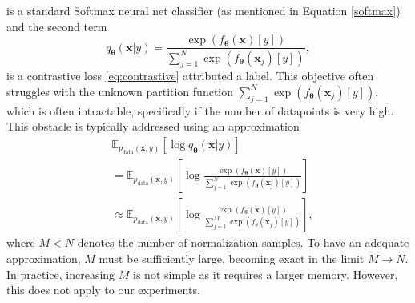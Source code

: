 is a standard Softmax neural net classifier (as mentioned in Equation \eqref{softmax}) and the second term 
\begin{equation}
	q_{\boldsymbol{\theta}}\left(\boldsymbol{x}|y\right) = \frac{\exp\left({f_{\boldsymbol{\theta}}\left(\boldsymbol{x}\right)[y]}\right)}{\sum_{j=1}^N\exp\left({f_{\boldsymbol{\theta}}\left(\boldsymbol{x}_j\right)[y]}\right)},
\end{equation}
is a contrastive loss \eqref{eq:contrastive} attributed a label. This objective often struggles with the unknown partition function $\sum_{j=1}^N\exp\left({f_{\boldsymbol{\theta}}\left({\boldsymbol{x}_j}\right)[y]}\right)$, which is often intractable, specifically if the number of datapoints is very high. This obstacle is typically addressed using an approximation 
\begin{align}\label{approxcontrasstive}
	&\mathbb{E}_{p_{\mathrm{data}}(\boldsymbol{x},y)}\left[ \log q_{\boldsymbol{\theta}}\left(\boldsymbol{x}|y\right) \right] \\
	&=\mathbb{E}_{p_{\mathrm{data}}(\boldsymbol{x},y)}\left[\log \frac{\exp\left({f_{\boldsymbol{\theta}}\left(\boldsymbol{x}\right)[y]}\right)}{\sum_{j=1}^N\exp\left({f_{\boldsymbol{\theta}}\left(\boldsymbol{x}_j\right)[y]}\right)} \right]  \\
	&\approx\mathbb{E}_{p_{\mathrm{data}}(\boldsymbol{x},y)}\left[\log \frac{\exp\left({f_{\boldsymbol{\theta}}\left(\boldsymbol{x}\right)[y]}\right)}{\sum_{j=1}^M\exp\left({f_\theta\left(\boldsymbol{x}_j\right)[y]}\right)} \right],
\end{align}
where $M < N$ denotes the number of normalization samples. To have an adequate approximation, $M$ must be sufficiently large, becoming exact in the limit $M \to N$. In practice, increasing $M$ is not simple as it requires a larger memory. However, this does not apply to our experiments. 

